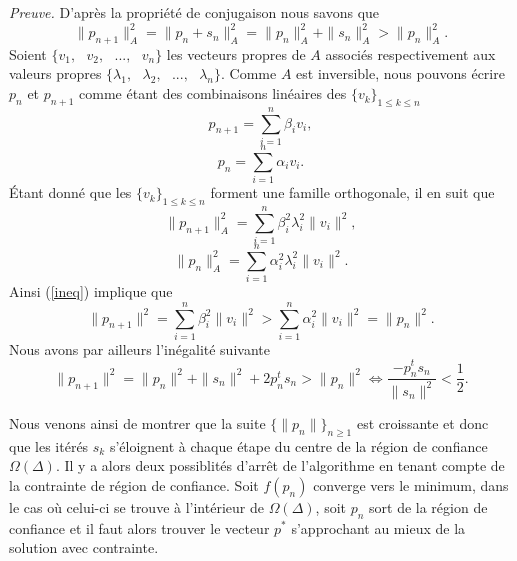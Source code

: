 \noindent
\textit{Preuve.} D'après la propriété de conjugaison nous savons que
\begin{equation}\tag{1}\label{ineq}
    \|p_{n+1}\|_A^2 = \|p_n + s_n\|_A^2 = \|p_n\|_A^2 + \|s_n\|_A^2 > \|p_n\|_A^2.
\end{equation}
Soient $\{v_1, \text{ } v_2, \text{ }..., \text{ } v_n\}$ les vecteurs propres de $A$ associés respectivement aux valeurs propres $\{\lambda_1, \text{ } \lambda_2, \text{ }..., \text{ } \lambda_n\}$. Comme $A$ est inversible, nous pouvons écrire $p_n$ et $p_{n+1}$ comme étant des combinaisons linéaires des $\{v_k\}_{1 \leq k \leq n}$
\begin{equation}\tag{2.a}
    p_{n+1} = \sum_{i=1}^n \beta_i v_i,
\end{equation}
\vspace{-0.2cm}
\begin{equation}\tag{2.b}
    p_n = \sum_{i=1}^n \alpha_i v_i.
\end{equation}
Étant donné que les $\{v_k\}_{1 \leq k \leq n}$ forment une famille orthogonale, il en suit que
\begin{equation}\tag{3.a}\label{orthogo}
    \|p_{n+1}\|_A^2 = \sum_{i=1}^n \beta_i^2 \lambda_i^2 \|v_i\|^2,
\end{equation}
\vspace{-0.2cm}
\begin{equation}\tag{3.b}
    \|p_n\|_A^2 = \sum_{i=1}^n \alpha_i^2 \lambda_i^2 \|v_i\|^2.
\end{equation}
Ainsi (\ref{ineq}) implique que
\begin{equation}\tag{4}
    \|p_{n+1}\|^2 = \sum_{i=1}^n \beta_i^2 \|v_i\|^2 > \sum_{i=1}^n \alpha_i^2 \|v_i\|^2 = \|p_n\|^2.
\end{equation}
Nous avons par ailleurs l'inégalité suivante
\begin{equation}\tag{5}
    \|p_{n+1}\|^2 = \|p_n\|^2 + \|s_n\|^2 + 2p_n^t s_n > \|p_n\|^2 \iff \frac{-p_n^t s_n}{\|s_n\|^2} < \frac{1}{2}.
\end{equation}

Nous venons ainsi de montrer que la suite $\{\|p_n\|\}_{n \geq 1}$ est croissante et donc que les itérés $s_k$ s'éloignent à chaque étape du centre de la région de confiance $\Omega(\Delta)$. Il y a alors deux possiblités d'arrêt de l'algorithme en tenant compte de la contrainte de région de confiance. Soit $f(p_n)$ converge vers le minimum, dans le cas où celui-ci se trouve à l'intérieur de $\Omega(\Delta)$, soit $p_n$ sort de la région de confiance et il faut alors trouver le vecteur $p^*$ s'approchant au mieux de la solution avec contrainte.

